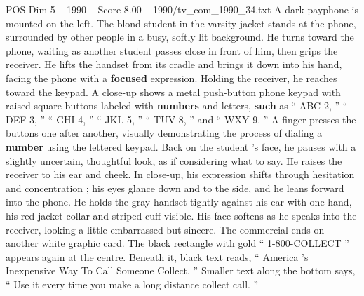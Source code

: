 \begin{textsample}{POS Dim 5 – 1990 – Score 8.00 – 1990/tv\_com\_1990\_34.txt}
A dark payphone is mounted on the left.
The blond student in the varsity jacket stands at the phone, surrounded by other people in a busy, softly lit background.
He turns toward the phone, waiting as another student passes close in front of him, then grips the receiver.
He lifts the handset from its cradle and brings it down into his hand, facing the phone with a \textbf{focused} expression.
Holding the receiver, he reaches toward the keypad.
A close-up shows a metal push-button phone keypad with raised square buttons labeled with \textbf{numbers} and letters, \textbf{such} as “ ABC 2, ” “ DEF 3, ” “ GHI 4, ” “ JKL 5, ” “ TUV 8, ” and “ WXY 9. ” A finger presses the buttons one after another, visually demonstrating the process of dialing a \textbf{number} using the lettered keypad.
Back on the student ’s face, he pauses with a slightly uncertain, thoughtful look, as if considering what to say.
He raises the receiver to his ear and cheek.
In close-up, his expression shifts through hesitation and concentration ; his eyes glance down and to the side, and he leans forward into the phone.
He holds the gray handset tightly against his ear with one hand, his red jacket collar and striped cuff visible.
His face softens as he speaks into the receiver, looking a little embarrassed but sincere.
The commercial ends on another white graphic card.
The black rectangle with gold “ 1-800-COLLECT ” appears again at the centre.
Beneath it, black text reads, “ America ’s Inexpensive Way To Call Someone Collect. ” Smaller text along the bottom says, “ Use it every time you make a long distance collect call. ”

\end{textsample}

